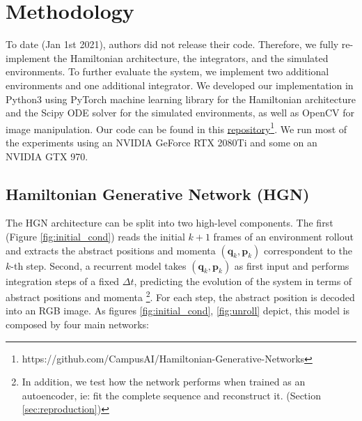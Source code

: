 \section{Methodology}
To date (Jan 1st 2021), authors did not release their code. Therefore, we fully re-implement the Hamiltonian architecture, the integrators, and the simulated environments. To further evaluate the system, we implement two additional environments and one additional integrator. We developed our implementation in Python3 using PyTorch \cite{pytorch} machine learning library for the Hamiltonian architecture and the Scipy \cite{scipy} ODE solver for the simulated environments, as well as OpenCV \cite{opencv_library} for image manipulation.
Our code can be found in this \href{https://github.com/CampusAI/Hamiltonian-Generative-Networks}{repository}\footnote{https://github.com/CampusAI/Hamiltonian-Generative-Networks}. We run most of the experiments using an NVIDIA GeForce RTX 2080Ti and some on an NVIDIA GTX 970.  


\subsection{Hamiltonian Generative Network (HGN)}

The HGN \cite{hgn} architecture can be split into two high-level components. The first (Figure \ref{fig:initial_cond}) reads the initial $k+1$ frames of an environment rollout and extracts the abstract positions and momenta $(\bm{q}_k, \bm{p}_k)$ correspondent to the $k$-th step. Second, a recurrent model takes $(\bm{q}_k, \bm{p}_k)$ as first input and performs integration steps of a fixed $\Delta t$, predicting the evolution of the system in terms of abstract positions and momenta \footnote{In addition, we test how the network performs when trained as an autoencoder, ie: fit the complete sequence and reconstruct it. (Section \ref{sec:reproduction}) }. For each step, the abstract position is decoded into an RGB image. As figures \ref{fig:initial_cond}, \ref{fig:unroll} depict, this model is composed by four main networks:

